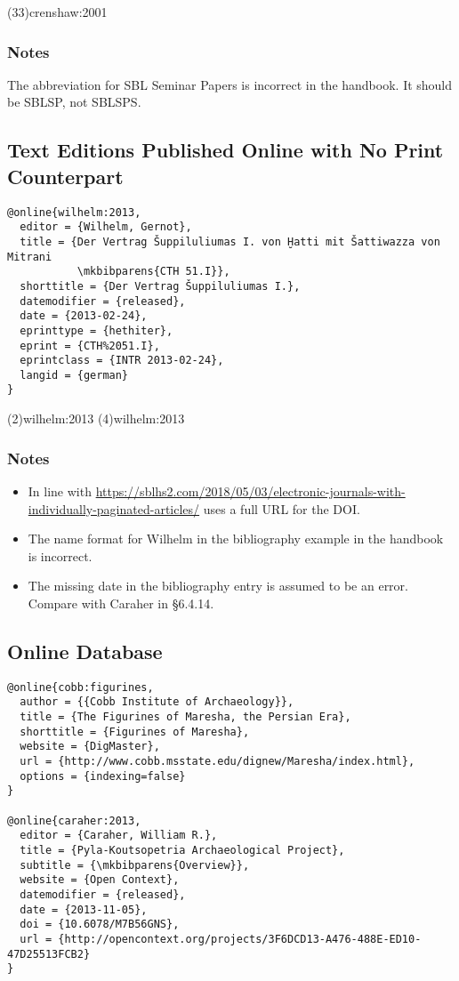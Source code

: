 \documentclass[a4paper]{article}
\begin{document}
\examplecite(33){crenshaw:2001}
\exampleabbreviations
\examplebibliography

\subsubsection{Notes}

The abbreviation for SBL Seminar Papers is incorrect in the handbook. It
should be SBLSP, not SBLSPS.

\subsection{Text Editions Published Online with No Print Counterpart}

\begin{verbatim}
@online{wilhelm:2013,
  editor = {Wilhelm, Gernot},
  title = {Der Vertrag Šuppiluliumas I. von Ḫatti mit Šattiwazza von Mitrani
           \mkbibparens{CTH 51.I}},
  shorttitle = {Der Vertrag Šuppiluliumas I.},
  datemodifier = {released},
  date = {2013-02-24},
  eprinttype = {hethiter},
  eprint = {CTH%2051.I},
  eprintclass = {INTR 2013-02-24},
  langid = {german}
}
\end{verbatim}

\examplecite(2){wilhelm:2013}
\examplecite(4){wilhelm:2013}
\examplebibliography

\subsubsection{Notes}

\begin{itemize}
  \item In line with
\url{https://sblhs2.com/2018/05/03/electronic-journals-with-individually-paginated-articles/}
 uses a full URL for the DOI.
  \item The name format for Wilhelm in the bibliography example in the handbook
    is incorrect.
  \item The missing date in the bibliography entry is assumed to be an error.
    Compare with Caraher in §6.4.14.
\end{itemize}

\subsection{Online Database}

\begin{verbatim}
@online{cobb:figurines,
  author = {{Cobb Institute of Archaeology}},
  title = {The Figurines of Maresha, the Persian Era},
  shorttitle = {Figurines of Maresha},
  website = {DigMaster},
  url = {http://www.cobb.msstate.edu/dignew/Maresha/index.html},
  options = {indexing=false}
}

@online{caraher:2013,
  editor = {Caraher, William R.},
  title = {Pyla-Koutsopetria Archaeological Project},
  subtitle = {\mkbibparens{Overview}},
  website = {Open Context},
  datemodifier = {released},
  date = {2013-11-05},
  doi = {10.6078/M7B56GNS},
  url = {http://opencontext.org/projects/3F6DCD13-A476-488E-ED10-47D25513FCB2}
}
\end{verbatim}
\end{document}
